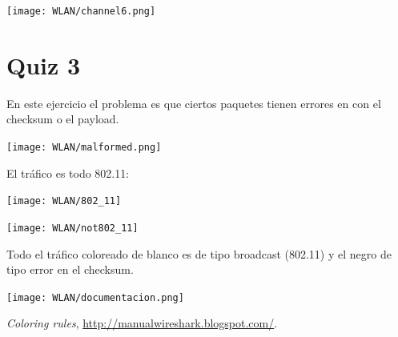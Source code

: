 \documentclass{article}
\begin{document}
\begin{center}
\texttt{[image: WLAN/channel6.png]} 
\end{center}

\section{Quiz 3}

En este ejercicio el problema es que ciertos paquetes tienen errores en con el checksum o el payload.

\begin{center}
\texttt{[image: WLAN/malformed.png]} 
\end{center}

El tráfico es todo 802.11:

\begin{center}
\texttt{[image: WLAN/802\_11]}
\end{center}
\begin{center}
\texttt{[image: WLAN/not802\_11]}
\end{center}

Todo el tráfico coloreado de blanco es de tipo broadcast (802.11) y el negro de tipo error en el checksum.

\begin{center}
\texttt{[image: WLAN/documentacion.png]} 
\end{center}

\begin{thebibliography}{9}

 \textit{Coloring rules}, \url{http://manualwireshark.blogspot.com/}.

\end{thebibliography}
\end{document}
